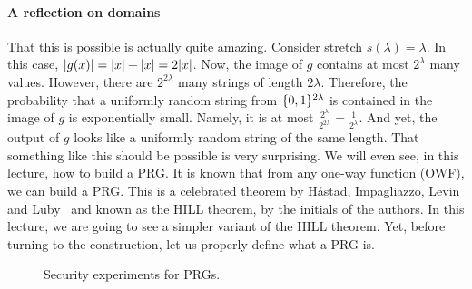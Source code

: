 \documentclass[a4paper,table,dvipsnames]{article}
\theoremstyle{definition}
\begin{document}
\paragraph{A reflection on domains}
That this is possible is actually quite amazing. Consider stretch $s(\lambda)=\lambda$. In this case, $\abs{g(x)}=\abs{x}+\abs{x}=2\abs{x}$.
Now, the image of $g$ contains at most $2^\lambda$ many values. However, there are $2^{2\lambda}$ many strings of length $2\lambda$. Therefore, the probability that a uniformly random string from $\{0,1\}^{2\lambda}$ is contained in the image of $g$ is exponentially small. Namely, it is at most $\frac{2^{\lambda}}{2^{2\lambda}}=\frac{1}{2^{\lambda}}$. And yet, the output of $g$ looks like a uniformly random string of the same length. That something like this should be possible is very surprising. We will even see, in this lecture, how to
build a PRG. It is known that from any one-way function (OWF), we can build a PRG. This is a celebrated theorem by H{\aa}stad, Impagliazzo, Levin and Luby~\url{} and known as the HILL theorem, by the initials of the authors. In this lecture, we are going to see a simpler variant of the HILL theorem. Yet, before turning to the construction, let us properly define what a PRG is.

\begin{wrapfigure}{R}{0.43\textwidth}
\vspace{-0.5cm}
\begin{center}
  \begin{pchstack}
  \pchspace
  \end{pchstack}\end{center}
\caption{Security experiments for PRGs.}
\label{fig:prg}
\vspace{-0.3cm}
\end{wrapfigure}
\end{document}
